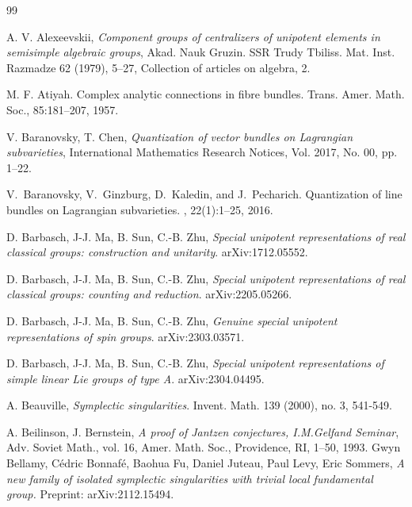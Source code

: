\documentclass[12pt]{amsart}
\theoremstyle{definition}
\numberwithin{equation}{section}
\begin{document}
\begin{thebibliography}{99}

 A. V. Alexeevskii, {\it Component groups of centralizers of unipotent elements in semisimple algebraic groups}, Akad. Nauk Gruzin. SSR Trudy Tbiliss. Mat. Inst. Razmadze 62 (1979), 5–27, Collection of articles on algebra, 2.

 M. F. Atiyah. Complex analytic connections in fibre bundles. Trans. Amer. Math. Soc., 85:181–207, 1957.

V. Baranovsky, T. Chen, {\it Quantization of vector bundles on Lagrangian subvarieties}, International Mathematics Research Notices, Vol. 2017, No. 00, pp. 1–22.

V.~Baranovsky, V.~Ginzburg, D.~Kaledin, and J.~Pecharich.
\newblock Quantization of line bundles on Lagrangian subvarieties.
, 22(1):1--25, 2016.

D. Barbasch, J-J. Ma, B. Sun, C.-B. Zhu, {\it Special unipotent representations of real classical groups: construction and unitarity}. arXiv:1712.05552.

 D. Barbasch, J-J. Ma, B. Sun, C.-B. Zhu,
{\it Special unipotent representations of real classical groups: counting and reduction}.
arXiv:2205.05266.

 D. Barbasch, J-J. Ma, B. Sun, C.-B. Zhu,
{\it Genuine special unipotent representations of spin groups}.
arXiv:2303.03571.

 D. Barbasch, J-J. Ma, B. Sun, C.-B. Zhu,
{\it Special unipotent representations of simple linear Lie groups of type A}.
arXiv:2304.04495.

 A. Beauville, {\it Symplectic singularities}. Invent. Math.  139  (2000),  no. 3, 541-549.	

 A. Beilinson, J. Bernstein, {\it A proof of Jantzen conjectures, I.M.Gelfand Seminar}, Adv. Soviet Math., vol. 16, Amer. Math. Soc., Providence, RI, 1–50, 1993.
Gwyn Bellamy, Cédric Bonnafé, Baohua Fu, Daniel Juteau, Paul Levy, Eric Sommers, {\it A new family of isolated symplectic singularities with trivial local fundamental group.} Preprint: arXiv:2112.15494.



\end{thebibliography}
\end{document}
